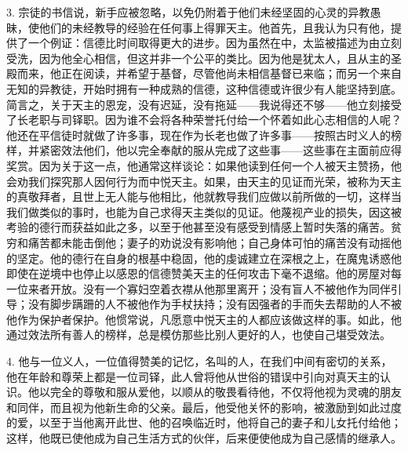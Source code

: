 3. 宗徒的书信说，新手应被忽略，以免仍附着于他们未经坚固的心灵的异教愚昧，使他们的未经教导的经验在任何事上得罪天主。他首先，且我认为只有他，提供了一个例证：信德比时间取得更大的进步。因为虽然在中，太监被描述为由立刻受洗，因为他全心相信，但这并非一个公平的类比。因为他是犹太人，且从主的圣殿而来，他正在阅读，并希望于基督，尽管他尚未相信基督已来临；而另一个来自无知的异教徒，开始时拥有一种成熟的信德，这种信德或许很少有人能坚持到底。简言之，关于天主的恩宠，没有迟延，没有拖延——我说得还不够——他立刻接受了长老职与司铎职。因为谁不会将各种荣誉托付给一个怀着如此心志相信的人呢？他还在平信徒时就做了许多事，现在作为长老也做了许多事——按照古时义人的榜样，并紧密效法他们，他以完全奉献的服从完成了这些事——这些事在主面前应得奖赏。因为关于这一点，他通常这样谈论：如果他读到任何一个人被天主赞扬，他会劝我们探究那人因何行为而中悦天主。如果，由天主的见证而光荣，被称为天主的真敬拜者，且世上无人能与他相比，他就教导我们应做以前所做的一切，这样当我们做类似的事时，也能为自己求得天主类似的见证。他蔑视产业的损失，因这被考验的德行而获益如此之多，以至于他甚至没有感受到情感上暂时失落的痛苦。贫穷和痛苦都未能击倒他；妻子的劝说没有影响他；自己身体可怕的痛苦没有动摇他的坚定。他的德行在自身的根基中稳固，他的虔诚建立在深根之上，在魔鬼诱惑他即使在逆境中也停止以感恩的信德赞美天主的任何攻击下毫不退缩。他的房屋对每一位来者开放。没有一个寡妇空着衣襟从他那里离开；没有盲人不被他作为同伴引导；没有脚步蹒跚的人不被他作为手杖扶持；没有因强者的手而失去帮助的人不被他作为保护者保护。他惯常说，凡愿意中悦天主的人都应该做这样的事。如此，他通过效法所有善人的榜样，总是模仿那些比别人更好的人，也使自己堪受效法。\par

4. 他与一位义人，一位值得赞美的记忆，名叫的人，在我们中间有密切的关系，他在年龄和尊荣上都是一位司铎，此人曾将他从世俗的错误中引向对真天主的认识。他以完全的尊敬和服从爱他，以顺从的敬畏看待他，不仅将他视为灵魂的朋友和同伴，而且视为他新生命的父亲。最后，他受他关怀的影响，被激励到如此过度的爱，以至于当他离开此世、他的召唤临近时，他将自己的妻子和儿女托付给他；这样，他既已使他成为自己生活方式的伙伴，后来便使他成为自己感情的继承人。\par

